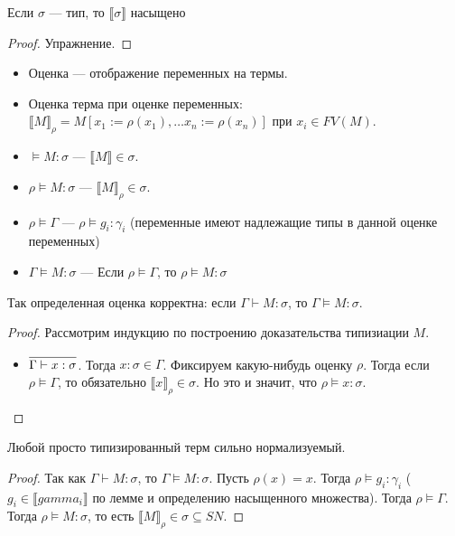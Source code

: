 \begin{lemma} Если $\sigma$ --- тип, то $\llbracket \sigma \rrbracket$ насыщено \end{lemma}
\begin{proof} Упражнение.
\end{proof}

\begin{definition}
\begin{itemize}
\item Оценка --- отображение переменных на термы. 
\item Оценка терма при оценке переменных: $\llbracket M \rrbracket_\rho = M[x_1 := \rho(x_1), \dots x_n := \rho(x_n)]$
при $x_i \in FV(M)$.
\item $\models M : \sigma$ --- $\llbracket M \rrbracket \in \sigma$.
\item $\rho \models M : \sigma$ --- $\llbracket M \rrbracket_\rho \in \sigma$.
\item $\rho \models \Gamma$ --- $\rho \models g_i : \gamma_i$ (переменные имеют надлежащие типы в данной оценке
переменных)
\item $\Gamma \models M : \sigma$ --- Если $\rho \models \Gamma$, то $\rho \models M : \sigma$
\end{itemize}
\end{definition}

\begin{theorem}
Так определенная оценка корректна: если $\Gamma\vdash M:\sigma$, то $\Gamma\models M:\sigma$.
\end{theorem}
\begin{proof}
Рассмотрим индукцию по построению доказательства типизиации $M$.
\begin{itemize}
\item $\infer{\Gamma\vdash x:\sigma}{}$. Тогда $x:\sigma \in \Gamma$. Фиксируем 
какую-нибудь оценку $\rho$. Тогда если $\rho\models\Gamma$, то обязательно
$\llbracket x \rrbracket_\rho \in \sigma$. Но это и значит, что $\rho\models x:\sigma$.

\end{itemize}
\end{proof}

\begin{theorem}
Любой просто типизированный терм сильно нормализуемый.
\end{theorem}
\begin{proof}
Так как $\Gamma \vdash M : \sigma$, то $\Gamma \models M : \sigma$. Пусть $\rho(x)=x$. Тогда
$\rho \models g_i : \gamma_i$ ($g_i \in \llbracket gamma_i \rrbracket$ по лемме и 
определению насыщенного множества). Тогда $\rho \models \Gamma$. Тогда 
$\rho \models M : \sigma$, то есть $\llbracket M \rrbracket_\rho \in \sigma \subseteq SN$.
\end{proof}
